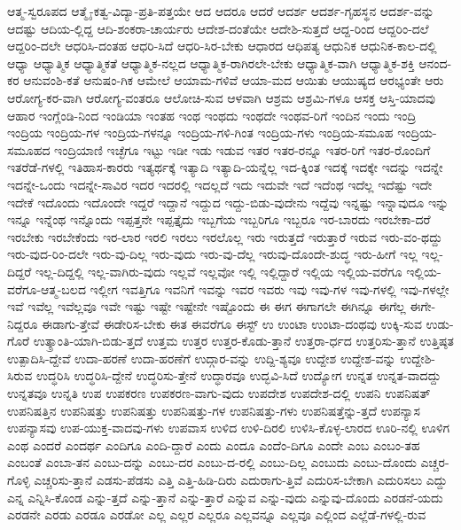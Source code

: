 {ಆತ್ಮ-ಸ್ವರೂಪದ
ಆತ್ಮೈ-ಕತ್ವ-ವಿದ್ಯಾ-ಪ್ರತಿ-ಪತ್ತಯೇ
ಆದ
ಆದರೂ
ಆದರೆ
ಆದರ್ಶ
ಆದರ್ಶ-ಗೃಹಸ್ಥನ
ಆದರ್ಶ-ವನ್ನು
ಆದಷ್ಟು
ಆದಿಯ-ಲ್ಲಿದ್ದ
ಆದಿ-ಶಂಕರಾ-ಚಾರ್ಯರು
ಆದೇಶ-ದಂತೆಯೇ
ಆದೇಶಿ-ಸುತ್ತದೆ
ಆದ್ದ-ರಿಂದ
ಆದ್ದರಿಂ-ದಲೆ
ಆದ್ದರಿಂ-ದಲೇ
ಆಧರಿಸಿ-ದಂತಹ
ಆಧರಿ-ಸಿದೆ
ಆಧರಿ-ಸಿರ-ಬೇಕು
ಆಧಾರದ
ಆಧಿಪತ್ಯ
ಆಧುನಿಕ
ಆಧುನಿಕ-ಕಾಲ-ದಲ್ಲಿ
ಆಧ್ಯಾ
ಆಧ್ಯಾತ್ಮಿಕ
ಆಧ್ಯಾತ್ಮಿಕತೆ
ಆಧ್ಯಾತ್ಮಿಕ-ನಲ್ಲದ
ಆಧ್ಯಾತ್ಮಿಕ-ರಾಗಿರಲೇ-ಬೇಕು
ಆಧ್ಯಾತ್ಮಿಕ-ವಾಗಿ
ಆಧ್ಯಾತ್ಮಿಕ-ಶಕ್ತಿ
ಆನಂದ-ಕರ
ಆನುವಂಶಿ-ಕತೆ
ಆನುಷಂ-ಗಿಕ
ಆಮೇಲೆ
ಆಯಾಮ-ಗಳಿವೆ
ಆಯಾ-ಮದ
ಆಯಿತು
ಆಯುಷ್ಯದ
ಆರಭ್ಯಂತೇ
ಆರು
ಆರೋಗ್ಯ-ಕರ-ವಾಗಿ
ಆರೋಗ್ಯ-ವಂತರೂ
ಆಲೋಚಿ-ಸುವ
ಆಳವಾಗಿ
ಆಶ್ರಮ
ಆಶ್ರಮಿ-ಗಳೂ
ಆಸಕ್ತ
ಆಸ್ತಿ-ಯಾದವು
ಆಹಾರ
ಇಂಗ್ಲೆಂಡಿ-ನಿಂದ
ಇಂಡಿಯಾ
ಇಂತಹ
ಇಂಥ
ಇಂಥದು
ಇಂಥದೇ
ಇಂಥವ-ರಿಗೆ
ಇಂದಿನ
ಇಂದು
ಇಂದ್ರಿ
ಇಂದ್ರಿಯ
ಇಂದ್ರಿಯ-ಗಳ
ಇಂದ್ರಿಯ-ಗಳನ್ನೂ
ಇಂದ್ರಿಯ-ಗಳಿ-ಗಿಂತ
ಇಂದ್ರಿಯ-ಗಳು
ಇಂದ್ರಿಯ-ಸಮೂಹ
ಇಂದ್ರಿಯ-ಸಮೂಹದ
ಇಂದ್ರಿಯಾಣಿ
ಇಚ್ಛೆಗೂ
ಇಟ್ಟು
ಇಡೀ
ಇಡು
ಇಡುವ
ಇತರ
ಇತರ-ರನ್ನೂ
ಇತರ-ರಿಗೆ
ಇತರ-ರೊಂದಿಗೆ
ಇತರೆಡೆ-ಗಳಲ್ಲಿ
ಇತಿಹಾಸ-ಕಾರರು
ಇತ್ಯರ್ಥಕ್ಕೆ
ಇತ್ಯಾದಿ
ಇತ್ಯಾದಿ-ಯನ್ನೆಲ್ಲ
ಇದ-ಕ್ಕಿಂತ
ಇದಕ್ಕೆ
ಇದಕ್ಕೇ
ಇದನ್ನು
ಇದನ್ನೇ
ಇದನ್ನೇ-ಒಂದು
ಇದನ್ನೇ-ಸಾವಿರ
ಇದರ
ಇದರಲ್ಲಿ
ಇದಲ್ಲದೆ
ಇದು
ಇದುವೇ
ಇದೆ
ಇದೆಂಥ
ಇದೆಲ್ಲ
ಇದೆಷ್ಟು
ಇದೇ
ಇದೇಕೆ
ಇದೊಂದು
ಇದೊಂದೇ
ಇದ್ದರೆ
ಇದ್ದಾನೆ
ಇದ್ದುದ
ಇದ್ದು-ಬಿಡು-ವುದೇನು
ಇದ್ದೆವು
ಇನ್ನಷ್ಟು
ಇನ್ನಾವುದೂ
ಇನ್ನು
ಇನ್ನೂ
ಇನ್ನೆಂಥ
ಇನ್ನೊಂದು
ಇಪ್ಪತ್ತನೇ
ಇಪ್ಪತ್ತೈದು
ಇಬ್ಬಗೆಯ
ಇಬ್ಬರಿಗೂ
ಇಬ್ಬರೂ
ಇರ-ಬಾರದು
ಇರಬೇಕಾ-ದರೆ
ಇರಬೇಕು
ಇರಬೇಕೆಂದು
ಇರ-ಲಾರ
ಇರಲಿ
ಇರಲು
ಇರಲೊಲ್ಲ
ಇರು
ಇರುತ್ತದೆ
ಇರುತ್ತಾರೆ
ಇರುವ
ಇರು-ವಂ-ಥದ್ದು
ಇರು-ವುದ-ರಿಂ-ದಲೇ
ಇರು-ವು-ದಿಲ್ಲ
ಇರು-ವುದು
ಇರು-ವು-ದೆಲ್ಲ
ಇರುವು-ದೊಂದೇ-ಶುದ್ಧ
ಇರು-ಹೀಗೆ
ಇಲ್ಲ
ಇಲ್ಲ-ದಿದ್ದರೆ
ಇಲ್ಲ-ದಿದ್ದಲ್ಲಿ
ಇಲ್ಲ-ವಾಗಿರು-ವುದು
ಇಲ್ಲವೆ
ಇಲ್ಲವೋ
ಇಲ್ಲಿ
ಇಲ್ಲಿದ್ದಾರೆ
ಇಲ್ಲಿಯ
ಇಲ್ಲಿಯ-ವರೆಗೂ
ಇಲ್ಲಿಯ-ವರೆಗೂ-ಆತ್ಮ-ಬಲದ
ಇಲ್ಲೀಗ
ಇವತ್ತಿಗೂ
ಇವನಿಗೆ
ಇವನ್ನು
ಇವರ
ಇವರು
ಇವು
ಇವು-ಗಳ
ಇವು-ಗಳಲ್ಲಿ
ಇವು-ಗಳಲ್ಲೇ
ಇವೆ
ಇವೆಲ್ಲ
ಇವೆಲ್ಲವೂ
ಇವೇ
ಇಷ್ಟು
ಇಷ್ಟೇ
ಇಷ್ಟೇನೇ
ಇಷ್ಟೊಂದು
ಈ
ಈಗ
ಈಗಾಗಲೇ
ಈಗಿನ್ನೂ
ಈಗೆಲ್ಲ
ಈಗೇ-ನಿದ್ದರೂ
ಈಡಾಗು-ತ್ತೇವೆ
ಈಡೇರಿಸ-ಬೇಕು
ಈತ
ಈವರೆಗೂ
ಈಸ್ಟ್
ಉ
ಉಂಟಾ
ಉಂಟಾ-ದಂಥವು
ಉಕ್ಕಿ-ಸುವ
ಉಡು-ಗೊರೆ
ಉತ್ಕ್ರಾಂತಿ-ಯಾಗಿ-ಬಿಡು-ತ್ತದೆ
ಉತ್ತಮ
ಉತ್ತರ
ಉತ್ತರ-ಕೊಡು-ತ್ತಾನೆ
ಉತ್ತರಾ-ರ್ಧದ
ಉತ್ತರಿಸು-ತ್ತಾನೆ
ಉತ್ತಿಷ್ಠತ
ಉತ್ಪಾದಿಸಿ-ದ್ದೇವೆ
ಉದಾ-ಹರಣೆ
ಉದಾ-ಹರಣೆಗೆ
ಉದ್ಗಾರ-ವನ್ನು
ಉದ್ದಿ-ಶ್ಯವೂ
ಉದ್ದೇಶ
ಉದ್ದೇಶ-ವನ್ನು
ಉದ್ದೇಶಿ-ಸಿರುವ
ಉದ್ಧರಿಸಿ
ಉದ್ಧರಿಸಿ-ದ್ದೇನೆ
ಉದ್ಧರಿಸು-ತ್ತೇನೆ
ಉದ್ಧಾರವೂ
ಉದ್ಭವಿ-ಸಿದೆ
ಉದ್ಯೋಗ
ಉನ್ನತ
ಉನ್ನತ-ವಾದದ್ದು
ಉನ್ನತವೂ
ಉನ್ನತಿ
ಉಪ
ಉಪಕರಣ
ಉಪಕರಣ-ವಾಗು-ವುದು
ಉಪದೇಶ
ಉಪದೇಶ-ದಲ್ಲಿ
ಉಪನಿ
ಉಪನಿಷತ್
ಉಪನಿಷತ್ತಿನ
ಉಪನಿಷತ್ತು
ಉಪನಿಷತ್ತು
ಉಪನಿಷತ್ತು-ಗಳ
ಉಪನಿಷತ್ತು-ಗಳು
ಉಪನಿಷತ್ತೆನ್ನು-ತ್ತದೆ
ಉಪನ್ಯಾಸ
ಉಪನ್ಯಾಸವು
ಉಪ-ಯುಕ್ತ-ವಾದವು-ಗಳು
ಉಪವಾಸ
ಉಳಿದ
ಉಳಿ-ದಿರಲಿ
ಉಳಿಸಿ-ಕೊಳ್ಳ-ಲಾರದ
ಊರಿ-ನಲ್ಲಿ
ಊಳಿಗ
ಎಂಥ
ಎಂದರೆ
ಎಂದರ್ಥ
ಎಂದಿಗೂ
ಎಂದಿ-ದ್ದಾರೆ
ಎಂದು
ಎಂದೂ
ಎಂದೆಂ-ದಿಗೂ
ಎಂದೇ
ಎಂಬ
ಎಂಬಂ-ತಹ
ಎಂಬಂತೆ
ಎಂಬಾ-ತನ
ಎಂಬು-ದನ್ನು
ಎಂಬು-ದರ
ಎಂಬು-ದ-ರಲ್ಲಿ
ಎಂಬು-ದಿಲ್ಲ
ಎಂಬುದು
ಎಂಬು-ದೊಂದು
ಎಚ್ಚರ-ಗೊಳ್ಳಿ
ಎಚ್ಚರಿಸು-ತ್ತಾನೆ
ಎಡಸು-ಪೆಡಸು
ಎತ್ತಿ
ಎತ್ತಿ-ಹಿಡಿ-ದಿರು
ಎದುರಾಗು-ತ್ತಿವೆ
ಎದುರಿಸ-ಬೇಕಾಗಿ
ಎದುರಿಸಲು
ಎದ್ದು
ಎನ್ನ
ಎನ್ನಿಸಿ-ಕೊಂಡ
ಎನ್ನು-ತ್ತದೆ
ಎನ್ನು-ತ್ತಾನೆ
ಎನ್ನು-ತ್ತಾರೆ
ಎನ್ನುವ
ಎನ್ನು-ವುದು
ಎನ್ನುವು-ದೊಂದು
ಎರಡನೆ-ಯದು
ಎರಡನೇ
ಎರಡು
ಎರಡೂ
ಎರಡೋ
ಎಲ್ಲ
ಎಲ್ಲರ
ಎಲ್ಲರೂ
ಎಲ್ಲವನ್ನೂ
ಎಲ್ಲವೂ
ಎಲ್ಲಿಂದ
ಎಲ್ಲೆಡೆ-ಗಳಲ್ಲಿ-ರುವ
}
